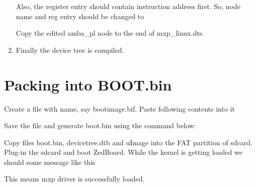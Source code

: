 \begin{enumerate}
		
	
	Also, the register entry should contain instruction address first. So, node name and reg entry should be changed to
	
			
		
		Copy the edited amba\_pl node to the end of mxp\_linux.dts.
		
		\item Finally the device tree is compiled.
	
			
		
			
\end{enumerate}
	
\section{Packing into BOOT.bin}

Create a file with name, say bootimage.bif. Paste following contents into it

	

Save the file and generate boot.bin using the command below:



Copy files boot.bin, devicetree.dtb and uImage into the FAT partition of sdcard. Plug-in the sdcard and boot ZedBoard. While the kernel is getting loaded we should some message like this



This means mxp driver is successfully loaded.

